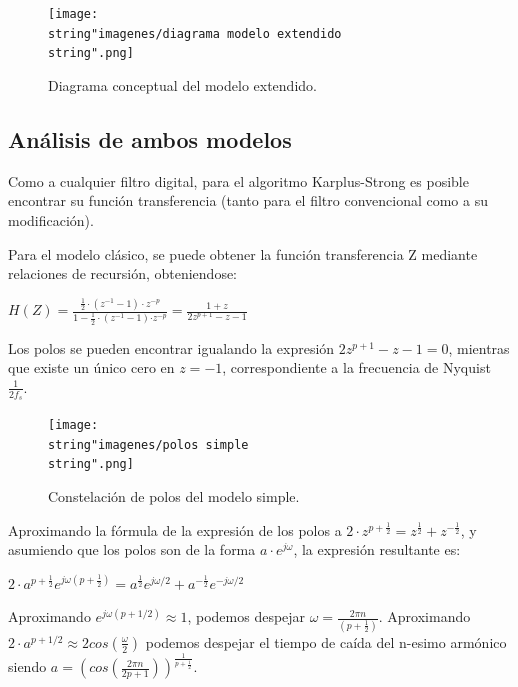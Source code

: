 \documentclass[../ASSD_TP2.tex]{subfiles}
\begin{document}
\begin{figure}[H]

\begin{centering}
\texttt{[image: \\string"imagenes/diagrama modelo extendido\\string".png]}\caption{Diagrama conceptual del modelo extendido.}
\par\end{centering}
\end{figure}


\subsection{Análisis de ambos modelos}

Como a cualquier filtro digital, para el algoritmo Karplus-Strong
es posible encontrar su función transferencia (tanto para el filtro
convencional como a su modificación).

Para el modelo clásico, se puede obtener la función transferencia
Z mediante relaciones de recursión, obteniendose:
\begin{center}
$H(Z)=\frac{\frac{1}{2}\cdot(z^{-1}-1)\cdot z^{-p}}{1-\frac{1}{2}\cdot(z^{-1}-1)\text{·}z^{-p}}=\frac{1+z}{2z^{p+1}-z-1}$
\par\end{center}

Los polos se pueden encontrar igualando la expresión $2z^{p+1}-z-1=0$,
mientras que existe un único cero en $z=-1$, correspondiente a la
frecuencia de Nyquist $\frac{1}{2f_{s}}.$

\begin{figure}%
\centering{}\texttt{[image: \\string"imagenes/polos simple\\string".png]}\caption{Constelación de polos del modelo simple.}
\end{figure}%

Aproximando la fórmula de la expresión de los polos a $2\cdot z^{p+\frac{1}{2}}=z^{\frac{1}{2}}+z^{-\frac{1}{2}}$,
y asumiendo que los polos son de la forma $a\cdot e^{j\omega}$, la
expresión resultante es:
\begin{center}
$2\cdot a^{p+\frac{1}{2}}e^{j\omega(p+\frac{1}{2})}=a^{\frac{1}{2}}e^{j\omega/2}+a^{-\frac{1}{2}}e^{-j\omega/2}$
\par\end{center}

Aproximando $e^{j\omega(p+1/2)}\approx1$, podemos despejar $\omega=\frac{2\pi n}{(p+\frac{1}{2})}$.
Aproximando $2\cdot a^{p+1/2}\approx2cos(\frac{\omega}{2})$ podemos
despejar el tiempo de caída del n-esimo armónico siendo $a=(cos(\frac{2\pi n}{2p+1}))^{\frac{1}{p+\frac{1}{2}}}$. 
\end{document}
